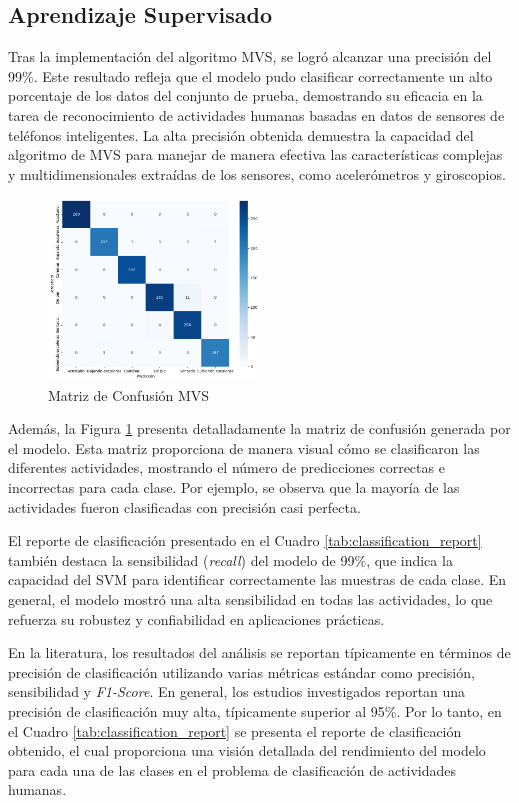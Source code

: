 \documentclass{esannV2}
\begin{document}
\subsection{Aprendizaje Supervisado}
Tras la implementación del algoritmo MVS, se logró alcanzar una precisión del 99\%. Este resultado refleja que el modelo pudo clasificar correctamente un alto porcentaje de los datos del conjunto de prueba, demostrando su eficacia en la tarea de reconocimiento de actividades humanas basadas en datos de sensores de teléfonos inteligentes. La alta precisión obtenida demuestra la capacidad del algoritmo de MVS para manejar de manera efectiva las características complejas y multidimensionales extraídas de los sensores, como acelerómetros y giroscopios.
\begin{figure}[ht!]
\centering
\includegraphics[width=0.5\textwidth]{figs/SVM_matriz.png}
\caption{Matriz de Confusión MVS}\label{Fig:matriz_SVG}
\end{figure}
Además, la Figura \ref{Fig:matriz_SVG} presenta detalladamente la matriz de confusión generada por el modelo. Esta matriz proporciona de manera visual cómo se clasificaron las diferentes actividades, mostrando el número de predicciones correctas e incorrectas para cada clase. Por ejemplo, se observa que la mayoría de las actividades fueron clasificadas con precisión casi perfecta.

El reporte de clasificación presentado en el Cuadro \ref{tab:classification_report} también destaca la sensibilidad (\textit{recall}) del modelo de 99\%, que indica la capacidad del SVM para identificar correctamente las muestras de cada clase. En general, el modelo mostró una alta sensibilidad en todas las actividades, lo que refuerza su robustez y confiabilidad en aplicaciones prácticas.

En la literatura, los resultados del análisis se reportan típicamente en términos de precisión de clasificación utilizando varias métricas estándar como precisión, sensibilidad y \textit{F1-Score}. En general, los estudios investigados reportan una precisión de clasificación muy alta, típicamente superior al 95\%. Por lo tanto, en el Cuadro \ref{tab:classification_report} se presenta el reporte de clasificación obtenido, el cual proporciona una visión detallada del rendimiento del modelo para cada una de las clases en el problema de clasificación de actividades humanas.
\end{document}
